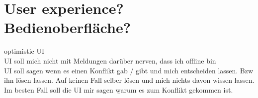 \section{User experience? Bedienoberfläche?}
\Gls{optimistic UI}\\
\gls{UI} soll mich nicht mit Meldungen darüber nerven, dass ich offline bin\\
\gls{UI} soll sagen wenn es einen Konflikt gab / gibt und mich entscheiden lassen. Bzw ihn lösen lassen.
Auf keinen Fall selber lösen und mich nichts davon wissen lassen.\\
Im besten Fall soll die \gls{UI} mir sagen \b{warum} es zum Konflikt gekommen ist.

